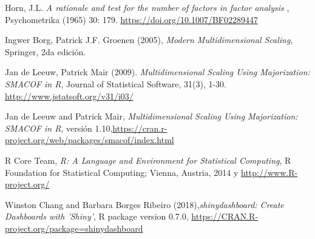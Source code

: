 \documentclass[paper=letter, fontsize=11pt]{scrartcl}
\numberwithin{equation}{section} %
\numberwithin{figure}{section} %
\numberwithin{table}{section} %
\begin{document}
\begin{thebibliography}{1}

Horn, J.L. \emph{A rationale and test for the number of factors in factor analysis
}, Psychometrika (1965) 30: 179. \url{https://doi.org/10.1007/BF02289447}

Ingwer Borg, Patrick J.F. Groenen (2005), \emph{Modern Multidimensional Scaling}, Springer, 2da edición. 

Jan de Leeuw, Patrick Mair (2009). \emph{Multidimensional Scaling Using Majorization: SMACOF in R}, Journal of Statistical Software, 31(3), 1-30. \url{http://www.jstatsoft.org/v31/i03/}

Jan de Leeuw and Patrick Mair, \emph{Multidimensional Scaling Using Majorization: SMACOF in R}, versión 1.10,\url{https://cran.r-project.org/web/packages/smacof/index.html}


R Core Team, \emph{R: A Language and Environment for Statistical Computing}, R Foundation for Statistical Computing; Vienna, Austria, 2014 y  \url{http://www.R-project.org/}


Winston Chang and Barbara Borges Ribeiro (2018),\emph{shinydashboard: Create Dashboards with 'Shiny'}, R package version 0.7.0, \url{https://CRAN.R-project.org/package=shinydashboard}





\end{thebibliography}
\end{document}
